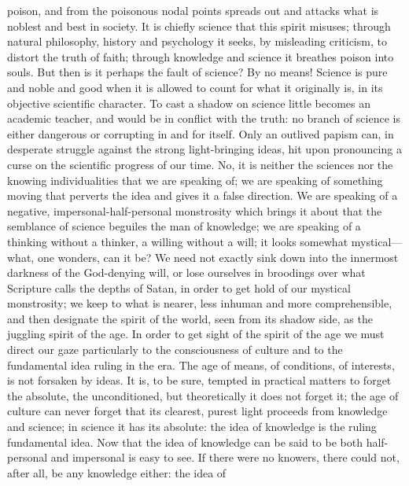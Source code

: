 \documentclass[12pt]{book}
\newcommand{\opage}[1]{\marginnote{\footnotesize\textit{[#1]}}}
\begin{document}
poison, and from the poisonous nodal points
\opage{55}\setcounter{footnote}{0}%
spreads out and attacks what is noblest and best in society. It is
chiefly science that this spirit misuses; through natural philosophy,
history and psychology it seeks, by misleading criticism, to distort the
truth of faith; through knowledge and science it breathes poison into
souls. But then is it perhaps the fault of science? By no means! Science
is pure and noble and good when it is allowed to count for what it
originally is, in its objective scientific character. To cast a shadow
on science little becomes an academic teacher, and would be in conflict
with the truth: no branch of science is either dangerous or corrupting
in and for itself. Only an outlived papism can, in desperate struggle
against the strong light-bringing ideas, hit upon pronouncing a curse on
the scientific progress of our time. No, it is neither the sciences nor
the knowing individualities that we are speaking of; we are speaking of
something moving that perverts the idea and gives it a false direction.
We are speaking of a negative, impersonal-half-personal monstrosity which
brings it about that the semblance of science beguiles the man of
knowledge; we are speaking of a thinking without a thinker, a willing
without a will; it looks somewhat mystical---what, one wonders, can it
be? We need not exactly sink down into the innermost darkness of the
God-denying will, or lose ourselves in broodings over what Scripture
calls the depths of Satan, in order to get hold of our mystical
monstrosity; we keep to what is nearer, less inhuman and more
comprehensible, and then designate the spirit of the world, seen from
its shadow side, as the juggling spirit of the age. In order to get
sight of the spirit of the age we must direct our gaze particularly to
the consciousness of culture and to the fundamental idea ruling in the
era. The age of means, of conditions, of interests, is not forsaken by
ideas. It is, to be sure, tempted in practical matters to forget the
absolute, the unconditioned, but
\opage{56}\setcounter{footnote}{0}%
theoretically it does not forget it; the age of culture can never forget
that its clearest, purest light proceeds from knowledge and science; in
science it has its absolute: the idea of knowledge is the ruling
fundamental idea. Now that the idea of knowledge can be said to be both
half-personal and impersonal is easy to see. If there were no knowers,
there could not, after all, be any knowledge either: the idea of
\end{document}
